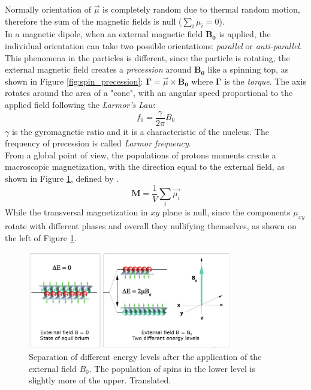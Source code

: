  \noindent Normally orientation of $\vec{\mu}$ is completely random due to thermal random motion, therefore the sum of the magnetic fields is null ($\sum_{i} \mu_{i} = 0$). \\
 In a magnetic dipole, when an external magnetic field $\mathbf{B_{0}}$ is applied, the individual orientation can take two possible orientations: \emph{parallel} or \emph{anti-parallel}. This phenomena in the particles is different, since the particle is rotating, the external magnetic field creates a \emph{precession} around $\mathbf{B_{0}}$ like a spinning top, as shown in Figure \ref{fig:spin_precession}: $\mathbf{\Gamma}=\vec{\mu} \times \mathbf{B_{0}}$ where $\mathbf{\Gamma}$ is the \emph{torque}. The axis rotates around the area of a "cone", with an angular speed proportional to the applied field following the \emph{Larmor's Law}:
 \begin{equation}
    f_{0}=\frac{\gamma}{2\pi} B_{0}
 \end{equation}
 $\gamma$ is the gyromagnetic ratio and it is a characteristic of the nucleus. The frequency of precession is called \emph{Larmor frequency}.\\
 From a global point of view, the populations of protons moments create a macroscopic magnetization, with the direction equal to the external field, as shown in Figure \ref{fig:macroscopic_magnetization}, defined by \cite{slides}.
 \begin{equation}
    \mathbf{M}=\frac{1}{V}\sum_{i} \vec{\mu_{i}}
 \end{equation}
 While the transversal magnetization in $xy$ plane is null, since the components $\mu_{xy}$ rotate with different phases and overall they nullifying themselves, as shown on the left of Figure \ref{fig:macroscopic_magnetization}.

 \begin{figure}[h]
    \centering
    \includegraphics[width=0.8\textwidth]{images/energy_protons.jpg}
    \caption{Separation of different energy levels after the application of the external field $B_0$. The population of spins in the lower level is slightly more of the upper.\cite{elementiRisonanza} Translated.}
    \label{fig:macroscopic_magnetization}
 \end{figure}

